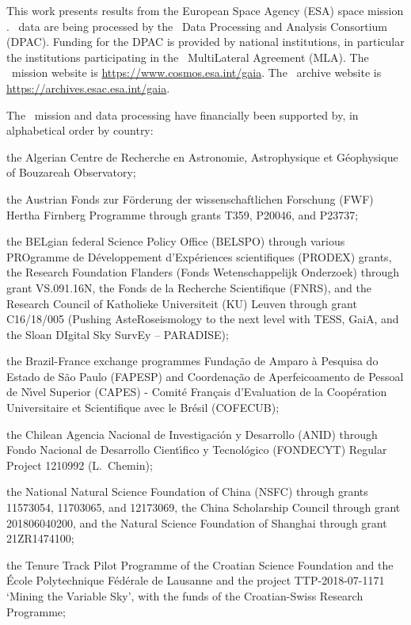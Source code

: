 This work presents results from the European Space Agency (ESA) space mission \gaia. \gaia\ data are being processed by the \gaia\ Data Processing and Analysis Consortium (DPAC). Funding for the DPAC is provided by national institutions, in particular the institutions participating in the \gaia\ MultiLateral Agreement (MLA). The \gaia\ mission website is \url{https://www.cosmos.esa.int/gaia}. The \gaia\ archive website is \url{https://archives.esac.esa.int/gaia}.

The \gaia\ mission and data processing have financially been supported by, in alphabetical order by country:

the Algerian Centre de Recherche en Astronomie, Astrophysique et G\'{e}ophysique of Bouzareah Observatory;

the Austrian Fonds zur F\"{o}rderung der wissenschaftlichen Forschung (FWF) Hertha Firnberg Programme through grants T359, P20046, and P23737;

the BELgian federal Science Policy Office (BELSPO) through various PROgramme de D\'{e}veloppement d'Exp\'{e}riences scientifiques (PRODEX) grants, the Research Foundation Flanders (Fonds Wetenschappelijk Onderzoek) through grant VS.091.16N, the Fonds de la Recherche Scientifique (FNRS), and the Research Council of Katholieke Universiteit (KU) Leuven through grant C16/18/005 (Pushing AsteRoseismology to the next level with TESS, GaiA, and the Sloan DIgital Sky SurvEy -- PARADISE);

the Brazil-France exchange programmes Funda\c{c}\~{a}o de Amparo \`{a} Pesquisa do Estado de S\~{a}o Paulo (FAPESP) and Coordena\c{c}\~{a}o de Aperfeicoamento de Pessoal de N\'{\i}vel Superior (CAPES) - Comit\'{e} Fran\c{c}ais d'Evaluation de la Coop\'{e}ration Universitaire et Scientifique avec le Br\'{e}sil (COFECUB);

the Chilean Agencia Nacional de Investigaci\'{o}n y Desarrollo (ANID) through Fondo Nacional de Desarrollo Cient\'{\i}fico y Tecnol\'{o}gico (FONDECYT) Regular Project 1210992 (L.~Chemin);

the National Natural Science Foundation of China (NSFC) through grants 11573054, 11703065, and 12173069, the China Scholarship Council through grant 201806040200, and the Natural Science Foundation of Shanghai through grant 21ZR1474100;  

the Tenure Track Pilot Programme of the Croatian Science Foundation and the \'{E}cole Polytechnique F\'{e}d\'{e}rale de Lausanne and the project TTP-2018-07-1171 `Mining the Variable Sky', with the funds of the Croatian-Swiss Research Programme;


